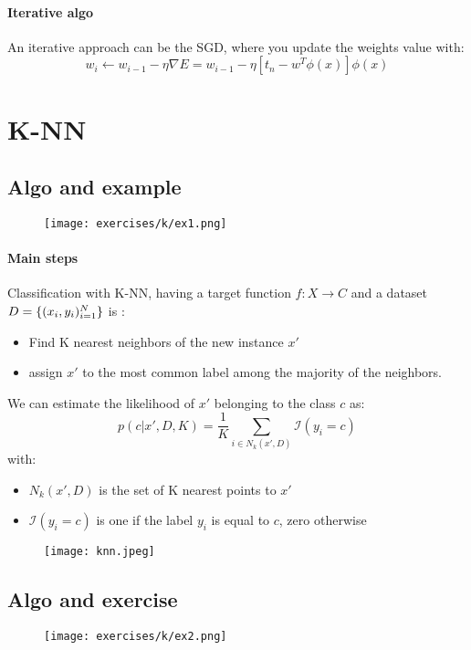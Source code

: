 \paragraph{Iterative algo}
An iterative approach can be the SGD, where you update the weights value with:
$$w_i \leftarrow w_{i-1} - \eta\nabla E=w_{i-1} - \eta[t_n-w^T\phi(x)]\phi(x)$$



\section{K-NN}

\subsection{Algo and example}

\begin{figure}[H]
    \centering
    \texttt{[image: exercises/k/ex1.png]}
\end{figure}

\paragraph{Main steps}
Classification with K-NN, having a target function $f:X\rightarrow C$ and a dataset $D=\lbrace{(x_i,y_i)^N_{i=1}}\rbrace$ is :
\begin{itemize}
\item Find K nearest neighbors of the new instance $x'$
\item assign $x'$ to the most common label among the majority of the neighbors.
\end{itemize}
We can estimate the likelihood of $x'$ belonging to the class $c$ as:
$$p(c| x',D,K)=\frac{1}{K}\sum_{i \in N_k(x',D)}\mathcal{I}(y_i=c)$$
with:
\begin{itemize}
\item $ N_k(x',D)$ is the set of K nearest points to $x'$
\item $\mathcal{I}(y_i=c)$ is one if the label $y_i$ is equal to $c$, zero otherwise
\end{itemize}


\begin{figure}[H]
    \centering
    \texttt{[image: knn.jpeg]}
\end{figure}




\subsection{Algo and exercise}
    \begin{figure}[H]
     \centering
    \texttt{[image: exercises/k/ex2.png]}
\end{figure}

